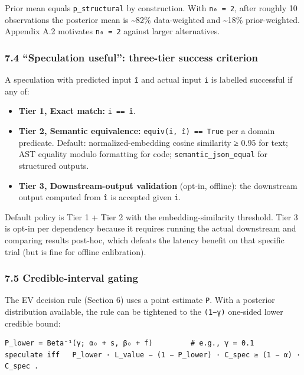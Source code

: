 \documentclass[
  11pt,
]{article}
\providecommand{\tightlist}{%
  \setlength{\itemsep}{0pt}\setlength{\parskip}{0pt}}
\begin{document}
Prior mean equals \texttt{p\_structural} by construction. With
\texttt{n₀\ =\ 2}, after roughly 10 observations the posterior mean is
\textasciitilde82\% data-weighted and \textasciitilde18\%
prior-weighted. Appendix A.2 motivates \texttt{n₀\ =\ 2} against larger
alternatives.

\subsubsection{7.4 ``Speculation useful'': three-tier success
criterion}\label{speculation-useful-three-tier-success-criterion}

A speculation with predicted input \texttt{î} and actual input
\texttt{i} is labelled successful if any of:

\begin{itemize}
\tightlist
\item
  \textbf{Tier 1, Exact match:} \texttt{i\ ==\ î}.
\item
  \textbf{Tier 2, Semantic equivalence:} \texttt{equiv(i,\ î)\ ==\ True}
  per a domain predicate. Default: normalized-embedding cosine
  similarity ≥ 0.95 for text; AST equality modulo formatting for code;
  \texttt{semantic\_json\_equal} for structured outputs.
\item
  \textbf{Tier 3, Downstream-output validation} (opt-in, offline): the
  downstream output computed from \texttt{î} is accepted given
  \texttt{i}.
\end{itemize}

Default policy is Tier 1 + Tier 2 with the embedding-similarity
threshold. Tier 3 is opt-in per dependency because it requires running
the actual downstream and comparing results post-hoc, which defeats the
latency benefit on that specific trial (but is fine for offline
calibration).

\subsubsection{7.5 Credible-interval
gating}\label{credible-interval-gating}

The EV decision rule (Section 6) uses a point estimate \texttt{P}. With
a posterior distribution available, the rule can be tightened to the
\texttt{(1−γ)} one-sided lower credible bound:

\begin{verbatim}
P_lower = Beta⁻¹(γ; α₀ + s, β₀ + f)         # e.g., γ = 0.1
speculate iff   P_lower · L_value − (1 − P_lower) · C_spec ≥ (1 − α) · C_spec .
\end{verbatim}
\end{document}
